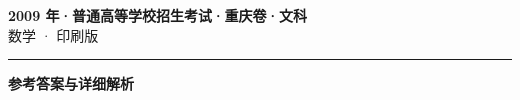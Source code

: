 \documentclass[zihao=5, a4paper]{ctexart}
\begin{document}
\begin{center}
  {\Large\bfseries 2009 年·普通高等学校招生考试·重庆卷·文科}\\[4pt]
  {\large 数学 · 印刷版}
\end{center}
\medskip
{}

\par\bigskip\hrule\bigskip
{}
\begin{center}{\large\bfseries 参考答案与详细解析}\end{center}
\smallskip

\end{document}

